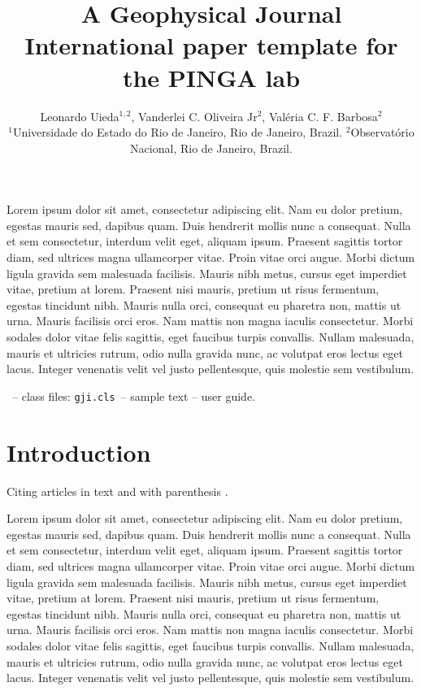 \documentclass[extra,mreferee]{gji}
\title[The running head]{
    A Geophysical Journal International paper template for the PINGA lab
}
\author[Uieda et al.]{
    Leonardo Uieda$^{1,2}$,
    Vanderlei C. Oliveira Jr$^2$,
    Val\'eria C. F. Barbosa$^2$
    \\
    $^1$Universidade do Estado do Rio de Janeiro, Rio de Janeiro, Brazil.
    $^2$Observat\'orio Nacional, Rio de Janeiro, Brazil.
}
\begin{document}
\label{firstpage}
\maketitle

\begin{summary}
Lorem ipsum dolor sit amet, consectetur adipiscing elit. Nam eu dolor pretium,
egestas mauris sed, dapibus quam. Duis hendrerit mollis nunc a consequat. Nulla
et sem consectetur, interdum velit eget, aliquam ipsum. Praesent sagittis
tortor diam, sed ultrices magna ullamcorper vitae. Proin vitae orci augue.
Morbi dictum ligula gravida sem malesuada facilisis. Mauris nibh metus, cursus
eget imperdiet vitae, pretium at lorem. Praesent nisi mauris, pretium ut risus
fermentum, egestas tincidunt nibh. Mauris nulla orci, consequat eu pharetra
non, mattis ut urna. Mauris facilisis orci eros. Nam mattis non magna iaculis
consectetur. Morbi sodales dolor vitae felis sagittis, eget faucibus turpis
convallis. Nullam malesuada, mauris et ultricies rutrum, odio nulla gravida
nunc, ac volutpat eros lectus eget lacus. Integer venenatis velit vel justo
pellentesque, quis molestie sem vestibulum.
\end{summary}

\begin{keywords}
 \LaTeXe\ -- class files: \verb"gji.cls"\ -- sample text -- user guide.
\end{keywords}



\section{Introduction}

Citing articles in text \citet{Asgharzadeh2007} and with parenthesis
\citep{Braitenberg2011}.

Lorem ipsum dolor sit amet, consectetur adipiscing elit. Nam eu dolor pretium,
egestas mauris sed, dapibus quam. Duis hendrerit mollis nunc a consequat. Nulla
et sem consectetur, interdum velit eget, aliquam ipsum. Praesent sagittis
tortor diam, sed ultrices magna ullamcorper vitae. Proin vitae orci augue.
Morbi dictum ligula gravida sem malesuada facilisis. Mauris nibh metus, cursus
eget imperdiet vitae, pretium at lorem. Praesent nisi mauris, pretium ut risus
fermentum, egestas tincidunt nibh. Mauris nulla orci, consequat eu pharetra
non, mattis ut urna. Mauris facilisis orci eros. Nam mattis non magna iaculis
consectetur. Morbi sodales dolor vitae felis sagittis, eget faucibus turpis
convallis. Nullam malesuada, mauris et ultricies rutrum, odio nulla gravida
nunc, ac volutpat eros lectus eget lacus. Integer venenatis velit vel justo
pellentesque, quis molestie sem vestibulum.
\end{document}
